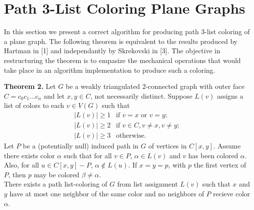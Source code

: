 \documentclass[11pt,letter]{article}
\begin{document}
\begin{comment}
  \node (1c2) at (1cm,1.25cm) {$c_2$};
  \node (1c3) at (2.25cm,1cm) {$c_3$};
  
  \node (c3) at (3.25cm,1cm) {$c_3$};
  \node (c4) at (4cm,0cm) {$c_4$};
  \node (c5) at (3.25cm,-1cm) {$c_5$};
  \node (c6) at (2cm,-1.25cm) {$c_6$};
  
  \node (2c6) at (1cm,-1.25cm) {$c_6$};
  \node (2c7) at (-0.25cm,-1cm) {$c_7$};
  
  \draw (0c1) -- (0c2); \draw (1c2) -- (1c3); \draw (c3) -- (c4) -- (c5) -- (c6) -- (c3);
  \draw (2c6) -- (2c7); \draw (c3)-- (c5) [dashed];
\end{tikzpicture}
\hfill\\
\hfill\\
\footnotesize{Removing $c_0$ and disecting into blocks with Theorem 2.}
\end{center}
\end{adjustwidth}
\hfill

\noindent Note that when applying Theorem 2, $G-c_0$ is $2$-connected
(i.e. $G-c_0=G_0$) if and only if Theorem 1 applies.

\end{comment}

\section*{Path 3-List Coloring Plane Graphs}

In this section we present a correct algorithm for producing path $3$-list coloring of a plane graph. The following
theorem is equivalent to the results produced by Hartman in [1] and independantly by Skrekovski in [3]. The objective in restructuring
the theorem is to empasize the mechanical operations that would take place in an algorithm implementation
to produce such a coloring.\\

\begin{adjustwidth}{2em}{2em}
\noindent\textbf{Theorem 2.} Let $G$ be a weakly triangulated $2$-connected graph with outer face $C=c_0c_1\ldots c_{n}$
and let $x,y\in C$, not necessarily distinct.
Suppose $L(v)$ assigns a list of colors to each $v\in V(G)$ such that
\[
    \begin{array}{ll}
	    |L(v)|\ge 1 & \text{if } v=x \text{ or } v=y;\\
	    |L(v)|\ge 2 & \text{if } v\in C, v\ne x, v\ne y;\\
	    |L(v)|\ge 3 & \text{otherwise.}
    \end{array}
\]
Let $P$ be a (potentially null) induced path in $G$ of vertices in $C[x,y]$. Assume
there exists color $\alpha$ such that for all $v\in P$, $\alpha\in L(v)$ and $v$ has been colored $\alpha$. Also,
for all $u\in C[x,y]-P$, $\alpha\not\in L(u)$. If $x=y=p$, with $p$ the first vertex of $P$,
then $p$ may be colored $\beta\ne\alpha$.\\

\noindent There exists a path list-coloring of $G$ from list assignment $L(v)$ such that $x$ and $y$ have at
most one neighbor of the same color and no neighbors of $P$ recieve color $\alpha$.\\
\end{adjustwidth}
\end{document}
